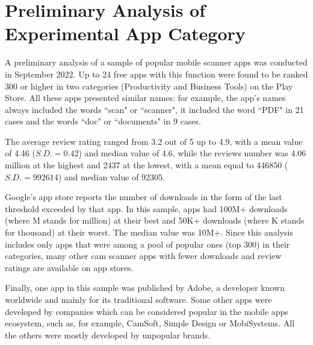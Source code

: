 \newpage
{}%
\chapter*{\thechapter \quad Preliminary Analysis of Experimental App Category}
\label{appendixC}

A preliminary analysis of a sample of popular mobile scanner apps was conducted in September 2022. Up to 24 free apps with this function were found to be ranked 300 or higher in two categories (Productivity and Business Tools) on the Play Store. All these apps presented similar names: for example, the app's names always included the words ``scan" or ``scanner", it included the word ``PDF" in 21 cases and the words ``doc" or ``documents" in 9 cases. 

The average review rating ranged from 3.2 out of 5 up to 4.9, with a mean value of 4.46 ($S.D.=0.42$) and median value of 4.6, while the reviews number was 4.06 million at the highest and 2437 at the lowest, with a mean equal to 446850 ($S.D.=992614$) and median value of 92305.  

Google's app store reports the number of downloads in the form of the last threshold exceeded by that app. In this sample, apps had 100M+ downloads (where M stands for million) at their best and 50K+ downloads (where K stands for thousand) at their worst. The median value was 10M+. Since this analysis includes only apps that were among a pool of popular ones (top 300) in their categories, many other cam scanner apps with fewer downloads and review ratings are available on app stores.

Finally, one app in this sample was published by Adobe, a developer known worldwide and mainly for its traditional software. Some other apps were developed by companies which can be considered popular in the mobile apps ecosystem, such as, for example, CamSoft, Simple Design or MobiSystems. All the others were mostly developed by unpopular brands.

